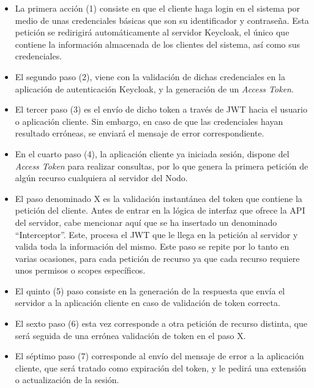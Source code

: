 \begin{itemize}
	\item La primera acción (1) consiste en que el cliente haga login en el sistema por medio de unas credenciales básicas que son su identificador y contraseña. Esta petición se redirigirá automáticamente al servidor Keycloak, el único que contiene la información almacenada de los clientes del sistema, así como sus credenciales. 
	
	\item El segundo paso (2), viene con la validación de dichas credenciales en la aplicación de autenticación Keycloak, y la generación de un \textit{Access Token}.
	
	\item El tercer paso (3) es el envío de dicho token a través de JWT hacia el usuario o aplicación cliente. Sin embargo, en caso de que las credenciales hayan resultado erróneas, se enviará el mensaje de error correspondiente. 
	
	\item En el cuarto paso (4), la aplicación cliente ya iniciada sesión, dispone del \textit{Access Token} para realizar consultas, por lo que genera la primera petición de algún recurso cualquiera al servidor del Nodo.
	
	\item El paso denominado X es la validación instantánea del token que contiene la petición del cliente. Antes de entrar en la lógica de interfaz que ofrece la API del servidor, cabe mencionar aquí que se ha insertado un denominado “Interceptor”. Este, procesa el JWT que le llega en la petición al servidor y valida toda la información del mismo. Este paso se repite por lo tanto en varias ocasiones, para cada petición de recurso ya que cada recurso requiere unos permisos o scopes específicos. 
	
	\item El quinto (5) paso consiste en la generación de la respuesta que envía el servidor a la aplicación cliente en caso de validación de token correcta. 
	
	\item El sexto paso (6) esta vez corresponde a otra petición de recurso distinta, que será seguida de una errónea validación de token en el paso X.
	
	\item El séptimo paso (7) corresponde al envío del mensaje de error a la aplicación cliente, que será tratado como expiración del token, y le pedirá una extensión o actualización de la sesión. 
	

\end{itemize}
